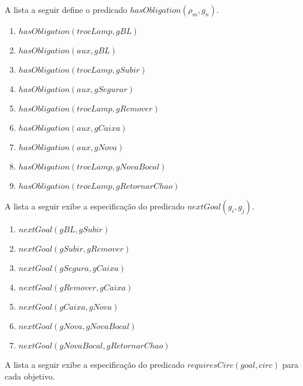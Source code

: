 A lista a seguir define o predicado $hasObligation(\rho_m,g_n)$. 

\begin{enumerate}
	\item $hasObligation(trocLamp,gBL)$
	\item $hasObligation(aux,gBL)$
	\item $hasObligation(trocLamp,gSubir)$
	\item $hasObligation(aux,gSegurar)$
	\item $hasObligation(trocLamp,gRemover)$
	\item $hasObligation(aux,gCaixa)$
	\item $hasObligation(aux,gNova)$
	\item $hasObligation(trocLamp,gNovaBocal)$
	\item $hasObligation(trocLamp,gRetornarChao)$
\end{enumerate}

A lista a seguir exibe a especificação do predicado $nextGoal(g_i,g_j)$. 

\begin{enumerate}
	\item $nextGoal(gBL,gSubir)$
	\item $nextGoal(gSubir,gRemover)$
	\item $nextGoal(gSegura,gCaixa)$ 
	\item $nextGoal(gRemover,gCaixa)$
	\item $nextGoal(gCaixa,gNova)$
	\item $nextGoal(gNova,gNovaBocal)$
	\item $nextGoal(gNovaBocal,gRetornarChao)$
\end{enumerate}

A lista a seguir exibe a especificação do predicado $requiresCirc(goal,circ)$ para cada objetivo.


